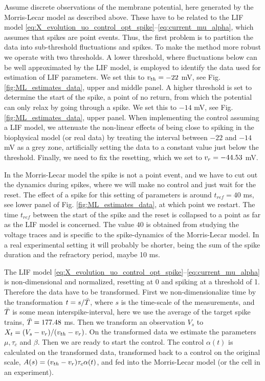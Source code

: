Assume discrete observations of the membrane potential, here generated
by the Morris-Lecar model as described above. These have to be related to the LIF model
\eqref{eq:X_evolution_uo_control_opt_spike}--\eqref{eq:current_mu_alpha}, which 
assumes that spikes are point events. Thus, the first problem is to
partition the data into sub-threshold fluctuations and spikes. To make
the method more robust we operate with two thresholds. A lower
threshold, where fluctuations below can be well approximated by the
LIF model, is employed to identify the data used for estimation of LIF
parameters. We set this to $v_{th} = -22$ mV, see
Fig. \ref{fig:ML_estimates_data}, upper and middle panel. A higher threshold is set to
determine the start of the spike, a point of no return, from which the potential can only
relax by going through a spike. We set this to $-14$ mV, see
Fig. \ref{fig:ML_estimates_data}, upper panel. When implementing the control
assuming a LIF model, we attenuate the non-linear effects of being
close to spiking in the biophysical model (or real data) by treating the interval between $-22$ and $-14$ mV
as a grey zone, artificially setting the data to a constant value just
below the threshold. Finally, we need to fix the resetting, which we
set to $v_r = -44.53$ mV.

In the Morris-Lecar model the spike is not a point event, and we have
to cut out the dynamics during spikes, where we will make no control
and just wait for the reset. The effect of a spike for this setting of
parameters is around $t_{ref} = 40$ ms, see lower panel of
Fig. \ref{fig:ML_estimates_data}, at
which point we restart. The time $t_{ref}$ between the start of the spike and
the reset is collapsed to
a point as far as the LIF model is concerned. The value $40$ is obtained from studying
the voltage traces and is specific to the spike-dynamics of the Morris-Lecar
model. In a real experimental setting it will probably be shorter,
being the sum of the spike duration and the refractory period, 
maybe 10 ms.

The LIF model \eqref{eq:X_evolution_uo_control_opt_spike}--\eqref{eq:current_mu_alpha}  is
non-dimensional and normalized, resetting at 0 and spiking at a threshold of 1.
Therefore the data have to be transformed. First we non-dimensionalize time by
the transformation $t=s/\bar T$, where $s$ is the time-scale of the
measurements, and $\bar T$ is some mean interspike-interval, here we use the
average of the target spike trains, $\bar T=177.48$ ms. Then we transform an
observation $V_s$ to $X_t =(V_s - v_r)/(v_{th} - v_r)$. On the transformed
data we estimate the parameters $\mu, \tau_c$ and $\beta$. Then we are ready to
start the control. The control $\alpha (t)$ is calculated on the transformed
data, transformed back to a control on the original scale, $A(s)=(v_{th} -
v_r)\tau_c \alpha (t)$, and fed into the Morris-Lecar model (or the cell in
an experiment).

